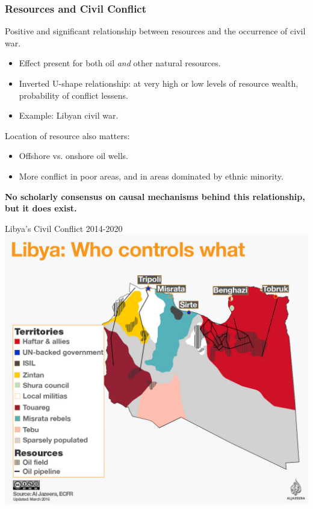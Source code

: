 \documentclass[handout]{beamer}
\begin{document}
\begin{frame} 
	\frametitle{\LARGE{Resources and Civil Conflict}}
	\begin{itemize}
		\large{
			\item Positive and significant relationship between resources and the occurrence of civil war. \pause
			\begin{itemize}
				\item Effect present for both oil \textit{and} other natural resources. \pause
				\item Inverted U-shape relationship: at very high or low levels of resource wealth, probability of conflict lessens. \pause
				\item Example: Libyan civil war. \pause
			\end{itemize}
			\item Location of resource also matters: \pause
			\begin{itemize}
				\item Offshore vs. onshore oil wells. \pause
				\item More conflict in poor areas, and in areas dominated by ethnic minority. \pause
			\end{itemize}
			\item \textbf{No scholarly consensus on causal mechanisms behind this relationship, but it does exist.}
		}
	\end{itemize}
\end{frame}

\begin{frame}{\LARGE Libya's Civil Conflict 2014-2020}
	\centering
	\includegraphics[width=\textwidth,height=0.8\textheight,keepaspectratio]{libya control.jpg}
\end{frame}
\end{document}
